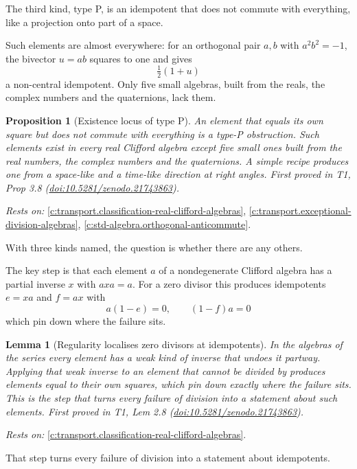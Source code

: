 \documentclass[11pt]{article}
\newtheorem{proposition}[theorem]{Proposition}
\newtheorem{lemma}[theorem]{Lemma}
\theoremstyle{definition}
\theoremstyle{plain}
\begin{document}
The third kind, type P, is an idempotent that does not commute with everything, like a projection onto part of a space.

Such elements are almost everywhere: for an orthogonal pair $a, b$ with $a^{2} b^{2} = -1$, the bivector $u = ab$ squares to one and gives \[ \tfrac12(1 + u) \] a non-central idempotent. Only five small algebras, built from the reals, the complex numbers and the quaternions, lack them.

\begin{proposition}[Existence locus of type P]\label{c:transport.existence-locus-type-p}
An element that equals its own square but does not commute with everything is a type-P obstruction. Such elements exist in every real Clifford algebra except five small ones built from the real numbers, the complex numbers and the quaternions. A simple recipe produces one from a space-like and a time-like direction at right angles.
\emph{First proved in} T1, Prop 3.8 (\href{https://doi.org/10.5281/zenodo.21743863}{doi:10.5281/zenodo.21743863}).
\end{proposition}
\noindent\emph{Rests on:} \ref{c:transport.classification-real-clifford-algebras}, \ref{c:transport.exceptional-division-algebras}, \ref{c:std-algebra.orthogonal-anticommute}.

With three kinds named, the question is whether there are any others.

The key step is that each element $a$ of a nondegenerate Clifford algebra has a partial inverse $x$ with $axa = a$. For a zero divisor this produces idempotents $e = xa$ and $f = ax$ with \[ a(1 - e) = 0, \qquad (1 - f)a = 0 \] which pin down where the failure sits.

\begin{lemma}[Regularity localises zero divisors at idempotents]\label{c:transport.regularity-localises-zero-divisors-idempotents}
In the algebras of the series every element has a weak kind of inverse that undoes it partway. Applying that weak inverse to an element that cannot be divided by produces elements equal to their own squares, which pin down exactly where the failure sits. This is the step that turns every failure of division into a statement about such elements.
\emph{First proved in} T1, Lem 2.8 (\href{https://doi.org/10.5281/zenodo.21743863}{doi:10.5281/zenodo.21743863}).
\end{lemma}
\noindent\emph{Rests on:} \ref{c:transport.classification-real-clifford-algebras}.

That step turns every failure of division into a statement about idempotents.
\end{document}

